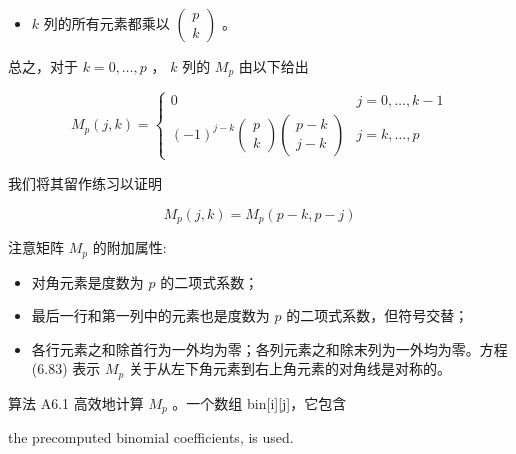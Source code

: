 \documentclass[../main.tex]{subfiles}
\begin{document}
\begin{itemize}
\item \(k\) 列的所有元素都乘以 \(\left( \begin{array}{l} p \\  k \end{array}\right)\) 。
\end{itemize}

总之，对于 \(k = 0,\ldots ,p\) ， \(k\) 列的 \({M}_{p}\) 由以下给出

\[
{M}_{p}\left( {j,k}\right)  = \left\{  \begin{matrix} 0 & j = 0,\ldots ,k - 1 \\  {\left( -1\right) }^{j - k}\left( \begin{array}{l} p \\  k \end{array}\right) \left( \begin{array}{l} p - k \\  j - k \end{array}\right) & j = k,\ldots ,p \end{matrix}\right.  \tag{6.82}
\]

我们将其留作练习以证明

\[
{M}_{p}\left( {j,k}\right)  = {M}_{p}\left( {p - k,p - j}\right)  \tag{6.83}
\]

注意矩阵 \({M}_{p}\) 的附加属性:

\begin{itemize}
\item 对角元素是度数为 \(p\) 的二项式系数；
\end{itemize}

\begin{itemize}
\item 最后一行和第一列中的元素也是度数为 \(p\) 的二项式系数，但符号交替；
\end{itemize}

\begin{itemize}
\item 各行元素之和除首行为一外均为零；各列元素之和除末列为一外均为零。方程 (6.83) 表示 \({M}_{p}\) 关于从左下角元素到右上角元素的对角线是对称的。
\end{itemize}

算法 A6.1 高效地计算 \({M}_{p}\) 。一个数组 bin[i][j]，它包含

the precomputed binomial coefficients, is used.
\end{document}
